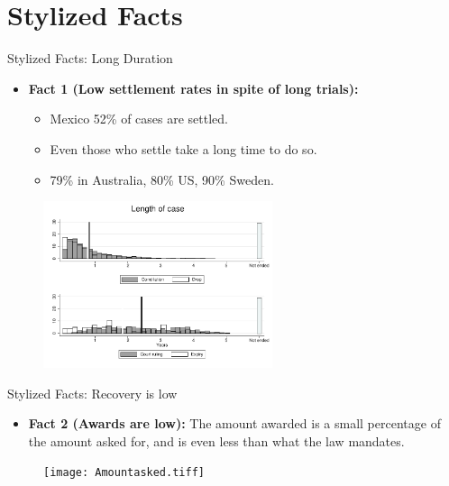 \documentclass[9pt]{beamer}
\begin{document}
\section{Stylized Facts}

\begin{frame}{Stylized Facts: Long Duration}
    \begin{itemize}
        \item \textbf{Fact 1 (Low settlement rates in spite of long trials):}
            \begin{itemize}
            \vspace{0.05in}
                \item Mexico 52\% of cases are settled.
                \vspace{0.05in}
                \item  Even those who settle take a long time to do so.
                \vspace{0.05in}
                \item 79\% in Australia, 80\% US, 90\% Sweden.
            \end{itemize}
    \end{itemize}
    \begin{figure}[H]
    \label{DurationFig}
    \begin{center}
        \includegraphics[width=0.6\textwidth]{Duracion.pdf}
        \end{center}
\end{figure}
\end{frame}


\begin{frame}{Stylized Facts: Recovery is low}
    \begin{itemize}
        \item \textbf{Fact 2 (Awards are low):} The amount awarded is a small percentage of the amount asked for, and is even less than what the law mandates.
            
    \end{itemize}
    \begin{figure}[H]
    \label{claimsvsoutcomes}
    \begin{center}
        \texttt{[image: Amountasked.tiff]}
        \end{center}
    \end{figure}    
\end{frame}
\end{document}
